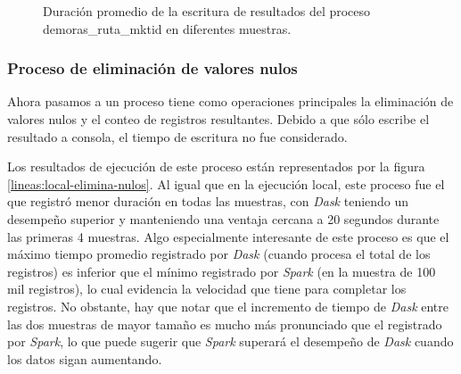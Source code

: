 \begin{figure}
\centering
{}
\caption{Duración promedio de la escritura de resultados del proceso demoras\_ruta\_mktid en diferentes muestras.}
\label{lineas:nube-demoras-ruta-mktid-write}
\end{figure}

\subsubsection{Proceso de eliminación de valores nulos}

Ahora pasamos a un proceso tiene como operaciones principales la eliminación de valores nulos y el conteo de registros resultantes. Debido a que sólo escribe el resultado a consola, el tiempo de escritura no fue considerado.

Los resultados de ejecución de este proceso están representados por la figura \ref{lineas:local-elimina-nulos}. Al igual que en la ejecución local, este proceso fue el que registró menor duración en todas las muestras, con \textit{Dask} teniendo un desempeño superior y manteniendo una ventaja cercana a 20 segundos durante las primeras 4 muestras. Algo especialmente interesante de este proceso es que el máximo tiempo promedio registrado por \textit{Dask} (cuando procesa el total de los registros) es inferior que el mínimo registrado por \textit{Spark} (en la muestra de 100 mil registros), lo cual evidencia la velocidad que tiene para completar los registros. No obstante, hay que notar que el incremento de tiempo de \textit{Dask} entre las dos muestras de mayor tamaño es mucho más pronunciado que el registrado por \textit{Spark}, lo que puede sugerir que \textit{Spark} superará el desempeño de \textit{Dask} cuando los datos sigan aumentando. 

